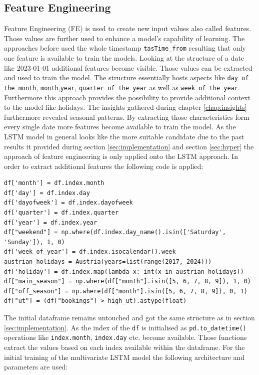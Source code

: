 \subsection{Feature Engineering}
\label{sec:feature_eng}
Feature Engineering (FE) is used to create new input values also called features. Those values are further used to enhance a model's capability of learning. \cite{feature_eng_2} The approaches before used the whole timestamp \verb|tasTime_from| resulting that only one feature is available to train the models.  
Looking at the structure of a date like 2023-01-01 additional features become visible. Those values can be extracted and used to train the model.  The structure essentially hosts aspects like \verb|day of the month|, \verb|month|,\verb|year|, \verb|quarter of the year| as well as \verb|week of the year|. Furthermore this approach provides the possibility to provide additional context to the model like holidays. The insights gathered during chapter \ref{chap:insights} furthermore revealed  seasonal patterns. By extracting those characteristics form every single date more features become available to train the model. As the LSTM model in general looks like the more suitable candidate due to the past results it provided during section \ref{sec:implementation} and section \ref{sec:hyper} the approach of feature engineering is only applied onto the LSTM approach.
\newline
In order to extract additional features the following code is applied: 
\begin{lstlisting}
df['month'] = df.index.month
df['day'] = df.index.day
df['dayofweek'] = df.index.dayofweek
df['quarter'] = df.index.quarter
df['year'] = df.index.year
df["weekend"] = np.where(df.index.day_name().isin(['Saturday', 'Sunday']), 1, 0)
df['week_of_year'] = df.index.isocalendar().week
austrian_holidays = Austria(years=list(range(2017, 2024)))
df['holiday'] = df.index.map(lambda x: int(x in austrian_holidays))
df["main_season"] = np.where(df["month"].isin([5, 6, 7, 8, 9]), 1, 0)
df["off_season"] = np.where(df["month"].isin([5, 6, 7, 8, 9]), 0, 1)
df["ut"] = (df["bookings"] > high_ut).astype(float)
\end{lstlisting}
The initial dataframe remains untouched and got the same structure as in section \ref{sec:implementation}. As the index of the \verb|df| is initialised as \verb|pd.to_datetime()| operations like \verb|index.month|, \verb|index.day| etc. become available. Those functions extract the values based on each index available within the dataframe. 
For the initial training of the multivariate LSTM model the following architecture and parameters are used:

